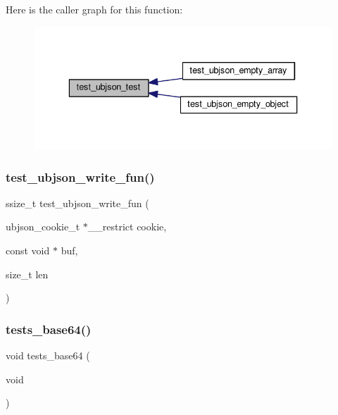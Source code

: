 Here is the caller graph for this function\+:
\nopagebreak
\begin{figure}[H]
\begin{center}
\leavevmode
\includegraphics[width=336pt]{group__unittests_gac5fe0b001cb96b33aaf4f1b52f7d38e9_icgraph}
\end{center}
\end{figure}
\mbox{\label{group__unittests_ga53e6c1e17347b7fa039be7245a0c76bf}} 
\subsubsection{\texorpdfstring{test\+\_\+ubjson\+\_\+write\+\_\+fun()}{test\_ubjson\_write\_fun()}}
{\footnotesize\ttfamily ssize\+\_\+t test\+\_\+ubjson\+\_\+write\+\_\+fun (\begin{DoxyParamCaption}\item[{ubjson\+\_\+cookie\+\_\+t $\ast$\+\_\+\+\_\+restrict}]{cookie,  }\item[{const void $\ast$}]{buf,  }\item[{size\+\_\+t}]{len }\end{DoxyParamCaption})}

\mbox{\label{group__unittests_gad8db0d2b50c5b552f0173f6e55cc21b4}} 
\subsubsection{\texorpdfstring{tests\+\_\+base64()}{tests\_base64()}}
{\footnotesize\ttfamily void tests\+\_\+base64 (\begin{DoxyParamCaption}\item[{void}]{ }\end{DoxyParamCaption})}



